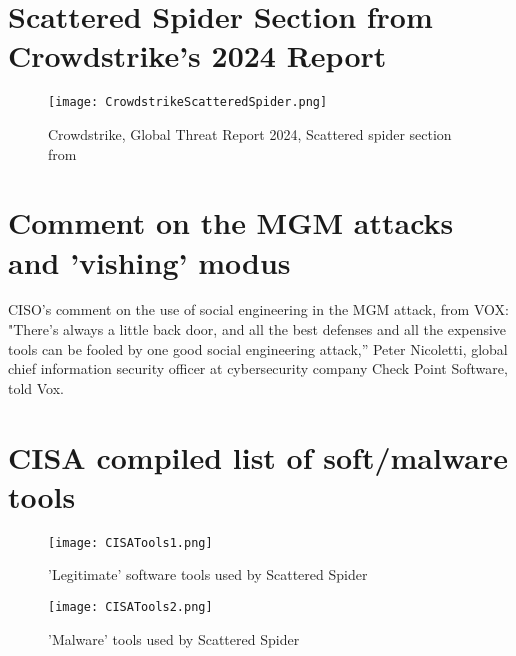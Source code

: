 \documentclass[
	letterpaper, %
	10pt, %
	unnumberedsections, %
	twoside, %
]{APAAssignment}
\begin{document}
\begin{appendices}
	\section{Scattered Spider Section from Crowdstrike's 2024 Report}\label{app:CrowdStrikeScatteredSpider}

	\begin{figure}[!htp] %
		\centering
		\texttt{[image: CrowdstrikeScatteredSpider.png]}
		\caption{Crowdstrike, Global Threat Report 2024, Scattered spider section from \cite{CrowdStrikeGTR2024}}
		\label{fig:CrowdStrikeScatteredSpider}
	\end{figure}

	\section{Comment on the MGM attacks and 'vishing' modus}\label{app:voxSocialEngQuote}
	CISO's comment on the use of social engineering in the MGM attack, from VOX\cite{VOXonMGM-Hack}: \\
	"There’s always a little back door, and all the best defenses and all the expensive tools can be fooled by one good social engineering attack,” Peter Nicoletti, global chief information security officer at cybersecurity company Check Point Software, told Vox.

	\section{CISA compiled list of soft/malware tools}\label{app:SoftwareTools}

	\begin{figure}[!htp] %
		\centering
		\texttt{[image: CISATools1.png]}
		\caption{'Legitimate' software tools used by Scattered Spider\cite{CISA_ScattetedSpider}}
		\label{fig:CISATools1}
	\end{figure}

	\begin{figure}[!htp] %
		\centering
		\texttt{[image: CISATools2.png]}
		\caption{'Malware' tools used by Scattered Spider\cite{CISA_ScattetedSpider}}
		\label{fig:CISATools2}
	\end{figure}


\end{appendices}
\end{document}
